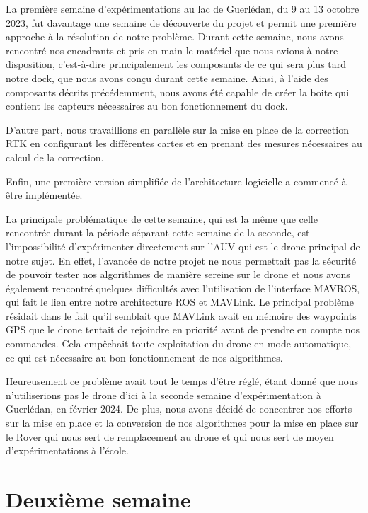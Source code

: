 \documentclass[12pt]{report}
\begin{document}
La première semaine d'expérimentations au lac de Guerlédan, du 9 au 13 octobre 2023, fut davantage une semaine de découverte du projet et permit une première approche à la résolution de notre problème. 
Durant cette semaine, nous avons rencontré nos encadrants et pris en main le matériel que nous avions à notre disposition, c'est-à-dire principalement les composants de ce qui sera plus tard notre dock,
que nous avons conçu durant cette semaine. Ainsi, à l'aide des composants décrits précédemment, nous avons été capable de créer la boite qui contient les capteurs nécessaires au bon fonctionnement du dock. 

D'autre part, nous travaillions en parallèle sur la mise en place de la correction RTK en configurant les différentes cartes et en prenant des mesures nécessaires au calcul de la correction. 

Enfin, une première version simplifiée de l'architecture logicielle a commencé à être implémentée. 


La principale problématique de cette semaine, qui est la même que celle rencontrée durant la période séparant cette semaine de la seconde, est l'impossibilité d'expérimenter directement sur l'AUV qui 
est le drone principal de notre sujet. En effet, l'avancée de notre projet ne nous permettait pas la sécurité de pouvoir tester nos algorithmes de manière sereine sur le drone et nous avons également 
rencontré quelques difficultés avec l'utilisation de l'interface MAVROS, qui fait le lien entre notre architecture ROS et MAVLink. Le principal problème résidait dans le fait qu'il semblait que MAVLink 
avait en mémoire des waypoints GPS que le drone tentait de rejoindre en priorité avant de prendre en compte nos commandes. Cela empêchait toute exploitation du drone en mode automatique, ce qui est nécessaire
au bon fonctionnement de nos algorithmes.

Heureusement ce problème avait tout le temps d'être réglé, étant donné que nous n'utiliserions pas le drone d'ici à la seconde semaine d'expérimentation à Guerlédan, en février 2024. De plus, nous avons 
décidé de concentrer nos efforts sur la mise en place et la conversion de nos algorithmes pour la mise en place sur le Rover qui nous sert de remplacement au drone et qui nous sert de moyen d'expérimentations à l'école. 


\section{Deuxième semaine}
\end{document}
